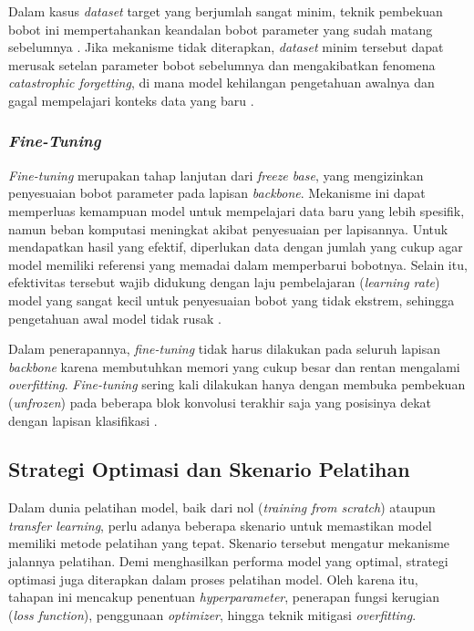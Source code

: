 Dalam kasus \textit{dataset} target yang berjumlah sangat minim, teknik pembekuan bobot ini mempertahankan keandalan bobot parameter yang sudah matang sebelumnya \cite{yosinski2014how}.
Jika mekanisme tidak diterapkan, \textit{dataset} minim tersebut dapat merusak setelan parameter bobot sebelumnya dan mengakibatkan fenomena \textit{catastrophic forgetting}, di mana model kehilangan pengetahuan awalnya dan gagal mempelajari konteks data yang baru \cite{kirkpatrick2017overcoming}. \par

\subsubsection{\textit{Fine-Tuning}} \label{II.Teori9.2}
\textit{Fine-tuning} merupakan tahap lanjutan dari \textit{freeze base}, yang mengizinkan penyesuaian bobot parameter pada lapisan \textit{backbone}.
Mekanisme ini dapat memperluas kemampuan model untuk mempelajari data baru yang lebih spesifik, namun beban komputasi meningkat akibat penyesuaian per lapisannya.
Untuk mendapatkan hasil yang efektif, diperlukan data dengan jumlah yang cukup agar model memiliki referensi yang memadai dalam memperbarui bobotnya.
Selain itu, efektivitas tersebut wajib didukung dengan laju pembelajaran (\textit{learning rate}) model yang sangat kecil untuk penyesuaian bobot yang tidak ekstrem, sehingga pengetahuan awal model tidak rusak \cite{goodfellow2016deep}. \par

Dalam penerapannya, \textit{fine-tuning} tidak harus dilakukan pada seluruh lapisan \textit{backbone} karena membutuhkan memori yang cukup besar dan rentan mengalami \textit{overfitting}.
\textit{Fine-tuning} sering kali dilakukan hanya dengan membuka pembekuan (\textit{unfrozen}) pada beberapa blok konvolusi terakhir saja yang posisinya dekat dengan lapisan klasifikasi \cite{yosinski2014how}. \par

\subsection{Strategi Optimasi dan Skenario Pelatihan} \label{II.Teori10}
Dalam dunia pelatihan model, baik dari nol (\textit{training from scratch}) ataupun \textit{transfer learning}, perlu adanya beberapa skenario untuk memastikan model memiliki metode pelatihan yang tepat.
Skenario tersebut mengatur mekanisme jalannya pelatihan. 
Demi menghasilkan performa model yang optimal, strategi optimasi juga diterapkan dalam proses pelatihan model.
Oleh karena itu, tahapan ini mencakup penentuan \textit{hyperparameter}, penerapan fungsi kerugian (\textit{loss function}), penggunaan \textit{optimizer}, hingga teknik mitigasi \textit{overfitting}. \par

